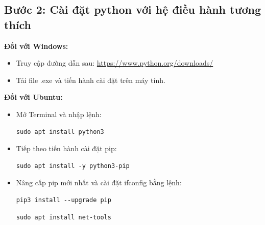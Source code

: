 \documentclass[a4paper]{article}
\newlength{\mylistingwidth}
\begin{document}
\subsection*{Bước 2: Cài đặt python với hệ điều hành tương thích}
\begin{par}
\textbf{Đối với Windows:}  
\begin{itemize}
    \item Truy cập đường dẫn sau: \href{https://www.python.org/downloads/}{https://www.python.org/downloads/}
    \item Tải file .exe và tiến hành cài đặt trên máy tính.
\end{itemize} 
\textbf{Đối với Ubuntu:}
\begin{itemize}
    \item Mở Terminal và nhập lệnh:
    \settowidth{\mylistingwidth}{\ttfamily sudo apt install python3}
    \begin{lstlisting}
sudo apt install python3
    \end{lstlisting}
    
    \item Tiếp theo tiến hành cài đặt pip:
    \settowidth{\mylistingwidth}{\ttfamily sudo apt install -y python3-pip}
    \begin{lstlisting}
sudo apt install -y python3-pip
    \end{lstlisting}
    
    \item Nâng cấp pip mới nhất và cài đặt ifconfig bằng lệnh:
    \settowidth{\mylistingwidth}{\ttfamily pip3 install --upgrade pip }
    \begin{lstlisting}
pip3 install --upgrade pip
    \end{lstlisting}
    
    \settowidth{\mylistingwidth}{\ttfamily sudo apt install net-tools}
    \begin{lstlisting}
sudo apt install net-tools
    \end{lstlisting}
\end{itemize}
\end{par}
\end{document}
